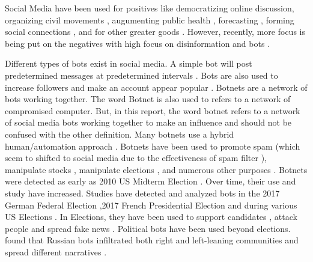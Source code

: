 \documentclass[letterpaper]{article}
\begin{document}
Social Media have been used for positives like democratizing online discussion, organizing civil movements \cite{gonzalez2013broadcasters}, augumenting public health 
\cite{dredze2012social}, forecasting \cite{asur2010predicting,nguyen2015sentiment,liu2016predicting}, forming social connections \cite{ellison2007benefits}, and 
for other greater goods \cite{moorhead2013new,househ2014empowering}. However, recently, more focus is being put on the negatives with high focus on disinformation and bots
\cite{forelle2015political,bradshaw2017troops,marwick2017media}. \par

Different types of bots exist in social media. A simple bot will post predetermined messages at predetermined intervals \cite{haustein2016tweets}. Bots are also used to increase followers
and make an account appear popular \cite{cresci2015fame}. Botnets are a network of bots working together. The word Botnet is also used to refers to a network of compromised computer. But, in this report, 
the word botnet refers to a network of social media bots working together to make an influence and should not be confused with the other definition. Many botnets use a hybrid human/automation 
approach \cite{grimme2018changing}. Botnets have been used to promote spam \cite{ferrara2018measuring} (which seem to shifted to social media due to the effectiveness of spam filter \cite{gao2010detecting,chu2012detecting,ferrara2018measuring}), 
manipulate stocks \cite{ferrara2015manipulation}, manipulate elections \cite{morstatter2018alt}, 
and numerous other purposes \cite{abokhodair2015dissecting}.
Botnets were detected as early as 2010 US Midterm Election \cite{mitter2014categorization}. Over time, their use and study have increased. 
Studies have detected and analyzed bots in the 2017 German Federal Election \cite{morstatter2018alt} ,2017 French Presidential Election \cite{ferrara2017disinformation} and during 
various US Elections \cite{mitter2014categorization,bovet2019influence,rizoiu2018debatenight,bessi2016social,howard2018algorithms,howard2016bots,deb2019perils}. In Elections, 
they have been used to support candidates \cite{luceri2019red}, attack people \cite{mueller_investigation} and spread fake news \cite{vosoughi2018spread,grinberg2019fake}. 
Political bots have been used beyond elections. \cite{stewart2018examining} found that Russian bots infiltrated both right and left-leaning communities and spread different narratives 
\cite{mueller_investigation}. \par
\end{document}
